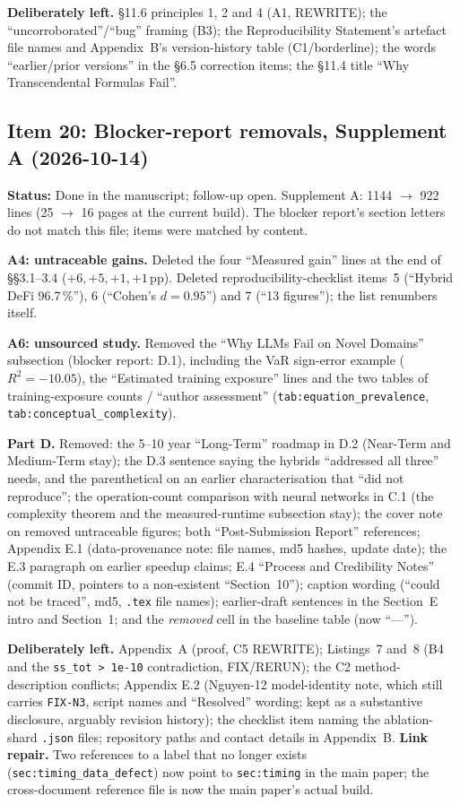 \documentclass[11pt]{article}
\newcommand{\Rsq}{R^{2}}
\begin{document}
\textbf{Deliberately left.} \S11.6 principles 1, 2 and 4 (A1, REWRITE); the ``uncorroborated''/``bug'' framing (B3); the Reproducibility Statement's artefact file names and Appendix~B's version-history table (C1/borderline);
the words ``earlier/prior versions'' in the \S6.5 correction items; the \S11.4 title ``Why Transcendental Formulas Fail''.

\subsection*{Item 20: Blocker-report removals, Supplement A (2026-10-14)}
\textbf{Status:} Done in the manuscript; follow-up open. Supplement A: 1144 $\to$ 922 lines (25 $\to$ 16 pages at the current build). The blocker report's section letters do not match this file; items were matched by content.

\textbf{A4: untraceable gains.} Deleted the four ``Measured gain'' lines at the end of \S\S3.1--3.4 ($+6,+5,+1,+1$\,pp). Deleted reproducibility-checklist items~5 (``Hybrid DeFi 96.7\,\%''), 6 (``Cohen's $d=0.95$'') and 7 (``13 figures''); the list renumbers itself.

\textbf{A6: unsourced study.} Removed the ``Why LLMs Fail on Novel Domains'' subsection (blocker report: D.1), including the VaR sign-error example ($\Rsq=-10.05$), the ``Estimated training exposure'' lines and the two tables of training-exposure counts / ``author assessment'' (\texttt{tab:equation\_prevalence}, \texttt{tab:conceptual\_complexity}).

\textbf{Part D.} Removed: the 5--10 year ``Long-Term'' roadmap in D.2 (Near-Term and Medium-Term stay); the D.3 sentence saying the hybrids ``addressed all three'' needs, and the parenthetical on an earlier characterisation that ``did not reproduce'';
the operation-count comparison with neural networks in C.1 (the complexity theorem and the measured-runtime subsection stay); the cover note on removed untraceable figures; both ``Post-Submission Report'' references;
Appendix E.1 (data-provenance note: file names, md5 hashes, update date); the E.3 paragraph on earlier speedup claims; E.4 ``Process and Credibility Notes'' (commit ID, pointers to a non-existent ``Section~10'');
caption wording (``could not be traced'', md5, \texttt{.tex} file names); earlier-draft sentences in the Section~E intro and Section~1; and the \emph{removed} cell in the baseline table (now ``---'').

\textbf{Deliberately left.} Appendix~A (proof, C5 REWRITE); Listings~7 and~8 (B4 and the \texttt{ss\_tot > 1e-10} contradiction, FIX/RERUN); the C2 method-description conflicts;
Appendix E.2 (Nguyen-12 model-identity note, which still carries \texttt{FIX-N3}, script names and ``Resolved'' wording; kept as a substantive disclosure, arguably revision history);
the checklist item naming the ablation-shard \texttt{.json} files; repository paths and contact details in Appendix~B.
\textbf{Link repair.} Two references to a label that no longer exists (\texttt{sec:timing\_data\_defect}) now point to \texttt{sec:timing} in the main paper; the cross-document reference file is now the main paper's actual build.
\end{document}
